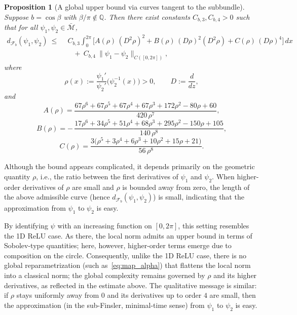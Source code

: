 \documentclass[12pt]{amsart}
\numberwithin{equation}{section}
\newtheorem{proposition}{Proposition}[section]
\theoremstyle{remark}
\begin{document}
\begin{proposition}[A global upper bound via curves tangent to the subbundle]
\label{prop:S1_global_bound}
Suppose \(b=\cos\beta\) with \(\beta/\pi\notin\mathbb Q\). Then there exist constants \(C_{b,3},C_{b,4}>0\) such that for all \(\psi_1,\psi_2\in\bar{\mathcal M}\),
\begin{equation}
\begin{aligned}
    d_{\mathcal F_b}(\psi_1,\psi_2)
    \ \le\ &\ C_{b,3}\int_0^{2\pi} \Big[ A(\rho)\,(D^2\rho)^2 + B(\rho)\,(D\rho)^2(D^2\rho) + C(\rho)\,(D\rho)^4 \Big]\,dx \\
    &\quad +\ C_{b,4}\ \|\psi_1-\psi_2\|_{C([0,2\pi])},
\end{aligned}
\end{equation}
where
\begin{equation}
\rho(x):=\frac{\psi_1'}{\psi_2'}\big(\psi_2^{-1}(x)\big)>0,\qquad D:=\frac{d}{dz},
\end{equation}
and
\[
A(\rho)=\frac{67\rho^6+67\rho^5+67\rho^4+67\rho^3+172\rho^2-80\rho+60}{420\,\rho^7},
\]
\[
B(\rho)=-\,\frac{17\rho^6+34\rho^5+51\rho^4+68\rho^3+295\rho^2-150\rho+105}{140\,\rho^8},
\]
\[
C(\rho)=\frac{3\big(\rho^5+3\rho^4+6\rho^3+10\rho^2+15\rho+21\big)}{56\,\rho^8}.
\]
\end{proposition}

\noindent
Although the bound appears complicated, it depends primarily on the geometric quantity \(\rho\), i.e., the ratio between the first derivatives of \(\psi_1\) and \(\psi_2\). When higher-order derivatives of \(\rho\) are small and \(\rho\) is bounded away from zero, the length of the above admissible curve (hence \(d_{\mathcal F_b}(\psi_1,\psi_2)\)) is small, indicating that the approximation from \(\psi_1\) to \(\psi_2\) is easy.

By identifying \(\psi\) with an increasing function on \([0,2\pi]\), this setting resembles the 1D ReLU case. As there, the local norm admits an upper bound in terms of Sobolev-type quantities; here, however, higher-order terms emerge due to composition on the circle. Consequently, unlike the 1D ReLU case, there is no global reparametrization (such as~\eqref{eq:map_alpha}) that flattens the local norm into a classical norm; the global complexity remains governed by \(\rho\) and its higher derivatives, as reflected in the estimate above. The qualitative message is similar: if \(\rho\) stays uniformly away from \(0\) and its derivatives up to order \(4\) are small, then the approximation (in the sub-Finsler, minimal-time sense) from \(\psi_1\) to \(\psi_2\) is easy.
\end{document}
